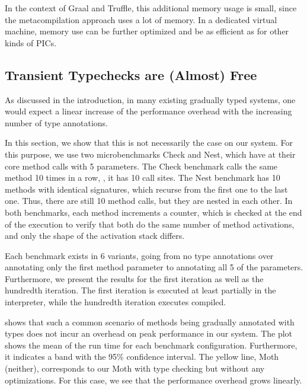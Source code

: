 In the context of Graal and Truffle, this additional memory usage is small,
since the metacompilation approach uses a lot of memory\citep{Marr:2015:MTPE}.
In a dedicated virtual machine,
memory use can be further optimized and be as efficient as for other kinds of PICs.


\subsection{Transient Typechecks are (Almost) Free}

As discussed in the introduction, in many existing gradually typed systems,
one would expect a linear increase of the performance overhead
with the increasing number of type annotations.

In this section, we show that this is not necessarily the case on our system.
For this purpose, we use two microbenchmarks Check and Nest,
which have at their core method calls with 5 parameters.
The Check benchmark calls the same method 10 times in a row, \ie, it has 10 call sites.
The Nest benchmark has 10 methods with identical signatures,
which recurse from the first one to the last one.
Thus, there are still 10 method calls, but they are nested in each other.
In both benchmarks, each method increments a counter,
which is checked at the end of the execution to verify that both do the same
number of method activations, and only the shape of the activation stack differs.

Each benchmark exists in 6 variants, going from no type annotations
over annotating only the first method parameter to annotating all 5 of the parameters.
Furthermore, we present the results for the first iteration as well as the hundredth iteration.
The first iteration is executed at least partially in the interpreter,
while the hundredth iteration executes compiled.

 shows that such a common scenario of methods being
gradually annotated with types
does not incur an overhead on peak performance in our system.
The plot shows the mean of the run time for each benchmark configuration.
Furthermore, it indicates a band with the 95\% confidence interval.
The yellow line, Moth (neither), corresponds to our Moth with type checking
but without any optimizations.
For this case, we see that the performance overhead grows linearly.

